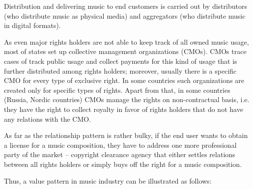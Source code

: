 \documentclass[12pt]{report}
\begin{document}
\begin{multicols}{2}
Distribution and delivering music to end customers is carried out by distributors (who distribute music as physical media) and aggregators (who distribute music in digital formats).

As even major rights holders are not able to keep track of all owned music usage, most of states set up collective management organizations (CMOs). CMOs trace cases of track public usage and collect payments for this kind of usage that is further distributed among rights holders; moreover, usually there is a specific CMO for every type of exclusive right. In some countries such organizations are created only for specific types of rights. Apart from that, in some countries (Russia, Nordic countries) CMOs manage the rights on non-contractual basis, i.e. they have the right to collect royalty in favor of rights holders that do not have any relations with the CMO.

As far as the relationship pattern is rather bulky, if the end user wants to obtain a license for a music composition, they have to address one more professional party of the market – copyright clearance agency that either settles relations between all rights holders or simply buys off the right for a music composition.

Thus, a value pattern in music industry can be illustrated as follows:
\end{multicols}
\vfill\null\pagebreak
\end{document}
